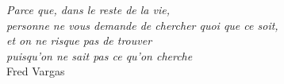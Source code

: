 \thispagestyle{empty}

\vspace*{\fill}

\vspace*{\fill}
\begin{flushright}
\textit{Parce que, dans le reste de la vie, \\
personne ne vous demande de chercher quoi que ce soit,\\
et on ne risque pas de trouver\\
puisqu'on ne sait pas ce qu'on cherche} \\
\vspace{0.05in}
Fred Vargas
\end{flushright}
\vspace*{\fill}



\vspace{5in}

